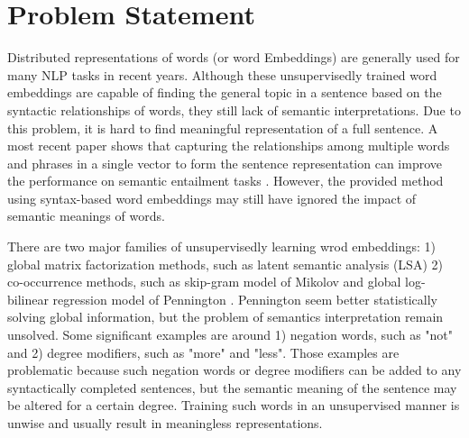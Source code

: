 \documentclass[10pt,twocolumn,letterpaper]{article}
\begin{document}
\section{Problem Statement}
Distributed representations of words (or word Embeddings)\cite{bengio2003neural, collobert2011natural, mikolov2013distributed, pennington2014glove} are generally used for many NLP tasks in recent years. Although these unsupervisedly trained word embeddings are capable of finding the general topic in a sentence based on the syntactic relationships of words, they still lack of semantic interpretations. Due to this problem, it is hard to find meaningful representation of a full sentence. A most recent paper shows that capturing the relationships among multiple words and phrases in a single vector to form the sentence representation can improve the performance on semantic entailment tasks \cite{conneau2017supervised}. However, the provided method using syntax-based word embeddings may still have ignored the impact of semantic meanings of words.

There are two major families of unsupervisedly learning wrod embeddings: 1) global matrix factorization methods, such as latent semantic analysis (LSA) \cite{deerwester1990indexing} 2) co-occurrence methods, such as skip-gram model of Mikolov \etal \cite{mikolov2013distributed} and global log-bilinear regression model of Pennington \etal \cite{pennington2014glove}. Pennington \etal seem better statistically solving global information, but the problem of semantics interpretation remain unsolved. Some significant examples are around 1) negation words, such as "not" and 2) degree modifiers, such as "more" and "less". Those examples are problematic because such negation words or degree modifiers can be added to any syntactically completed sentences, but the semantic meaning of the sentence may be altered for a certain degree. Training such words in an unsupervised manner is unwise and usually result in meaningless representations.
\end{document}
